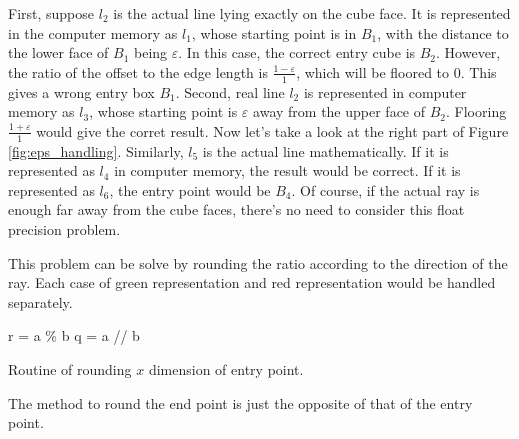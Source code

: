 First, suppose $l_2$ is the actual line lying exactly on the cube face. It is represented in the computer memory as $l_1$, whose starting point is in $B_1$, with the distance to the lower face of $B_1$ being $\varepsilon$. In this case, the correct entry cube is $B_2$. However, the ratio of the offset to the edge length is $\frac{1-\varepsilon}{1}$, which will be floored to 0. This gives a wrong entry box $B_1$. Second, real line $l_2$ is represented in computer memory as $l_3$, whose starting point is $\varepsilon$ away from the upper face of $B_2$. Flooring $\frac{1+\varepsilon}{1}$ would give the corret result. Now let's take a look at the right part of Figure \ref{fig:eps_handling}. Similarly, $l_5$ is the actual line mathematically. If it is represented as $l_4$ in computer memory, the result would be correct. If it is represented as $l_6$, the entry point would be $B_4$. Of course, if the actual ray is enough far away from the cube faces, there's no need to consider this float precision problem.

This problem can be solve by rounding the ratio according to the direction of the ray. Each case of green representation and red representation would be handled separately.

\IncMargin{1em}
\begin{algorithm}[H] \label{algo:properdivide}
    \DontPrintSemicolon
    \Output{\textcolor{red}{TODO}}
    r = a \% b\;
    q = a // b\;

    \caption{Routine of rounding $x$ dimension of entry point.}
\end{algorithm}
\DecMargin{1em}

The method to round the end point is just the opposite of that of the entry point.
